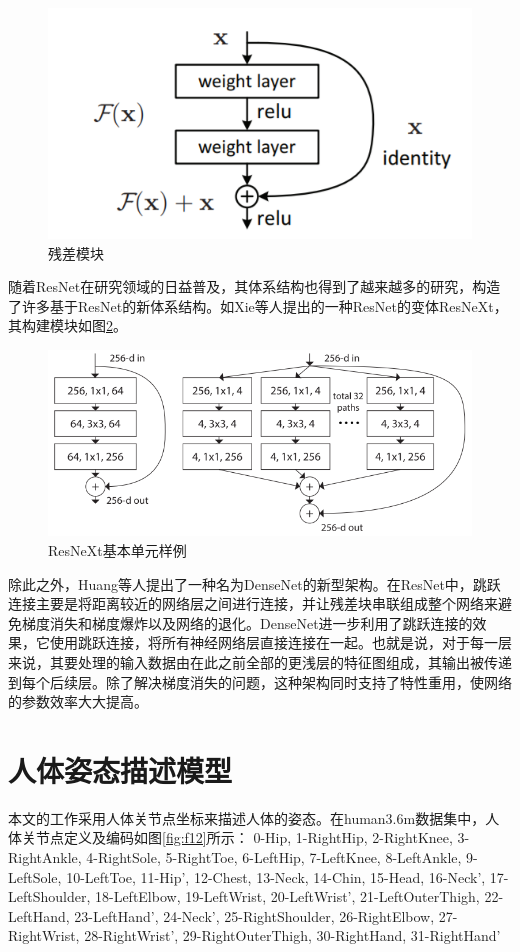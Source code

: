 \begin{figure}[h]
	\centering
	\includegraphics[scale=0.4]{figures/10.png}
	\caption{残差模块}
	\label{fig:f10}
\end{figure}

随着ResNet在研究领域的日益普及，其体系结构也得到了越来越多的研究，构造了许多基于ResNet的新体系结构。如Xie等人提出的一种ResNet的变体ResNeXt，其构建模块如图\ref{fig:f11}。

\begin{figure}[h]
	\centering
	\includegraphics[scale=1]{figures/11.png}
	\caption{ResNeXt基本单元样例}
	\label{fig:f11}
\end{figure}

除此之外，Huang等人提出了一种名为DenseNet的新型架构。在ResNet中，跳跃连接主要是将距离较近的网络层之间进行连接，并让残差块串联组成整个网络来避免梯度消失和梯度爆炸以及网络的退化。DenseNet进一步利用了跳跃连接的效果，它使用跳跃连接，将所有神经网络层直接连接在一起。也就是说，对于每一层来说，其要处理的输入数据由在此之前全部的更浅层的特征图组成，其输出被传递到每个后续层。除了解决梯度消失的问题，这种架构同时支持了特性重用，使网络的参数效率大大提高。



\section{人体姿态描述模型}
本文的工作采用人体关节点坐标来描述人体的姿态。在human3.6m数据集中，人体关节点定义及编码如图\ref{fig:f12}所示：
0-Hip, 1-RightHip, 2-RightKnee, 3-RightAnkle, 4-RightSole, 5-RightToe, 6-LeftHip, 7-LeftKnee, 8-LeftAnkle, 9-LeftSole, 10-LeftToe, 11-Hip’, 12-Chest, 13-Neck, 14-Chin, 15-Head, 16-Neck’, 17-LeftShoulder, 18-LeftElbow, 19-LeftWrist, 20-LeftWrist’, 21-LeftOuterThigh, 22-LeftHand, 23-LeftHand’, 24-Neck’, 25-RightShoulder, 26-RightElbow, 27-RightWrist, 28-RightWrist’, 29-RightOuterThigh, 30-RightHand, 31-RightHand’

